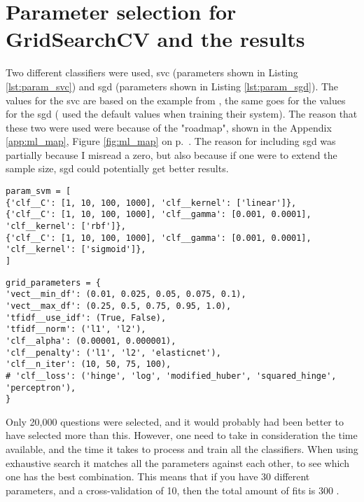 \section{Parameter selection for GridSearchCV and the results}
\label{sec:grid_search_and_results}
Two different classifiers were used, \gls{svc} (parameters shown in Listing \ref{lst:param_svc}) and \gls{sgd} (parameters shown in Listing \ref{lst:param_sgd}).
The values for the \gls{svc} are based on the example from \textcite{Scikitlearn.org2016k}, the same goes for the values for the \gls{sgd} \textcite{Scikitlearn.org2016l} 
(\cite{Huang2008, Maas2011, Zhang2003} used the default values when training their system). 
The reason that these two were used were because of the "roadmap", shown in the Appendix \ref{app:ml_map}, Figure \ref{fig:ml_map} on p.~\pageref{app:ml_map}. 
The reason for including \gls{sgd} was partially because I misread a zero, but also because if one were to extend the sample size, \gls{sgd} could potentially get better results.
\begin{lstlisting}[caption={Parameters for SVC}, label={lst:param_svc}] 
param_svm = [
{'clf__C': [1, 10, 100, 1000], 'clf__kernel': ['linear']},
{'clf__C': [1, 10, 100, 1000], 'clf__gamma': [0.001, 0.0001], 'clf__kernel': ['rbf']},
{'clf__C': [1, 10, 100, 1000], 'clf__gamma': [0.001, 0.0001], 'clf__kernel': ['sigmoid']},
]
\end{lstlisting}
\begin{lstlisting}[caption={Parameters for SGD}, label={lst:param_sgd}] 
grid_parameters = {
'vect__min_df': (0.01, 0.025, 0.05, 0.075, 0.1),
'vect__max_df': (0.25, 0.5, 0.75, 0.95, 1.0),
'tfidf__use_idf': (True, False),
'tfidf__norm': ('l1', 'l2'),
'clf__alpha': (0.00001, 0.000001),
'clf__penalty': ('l1', 'l2', 'elasticnet'),
'clf__n_iter': (10, 50, 75, 100),
# 'clf__loss': ('hinge', 'log', 'modified_huber', 'squared_hinge', 'perceptron'),
}
\end{lstlisting}
Only 20,000 questions were selected, and it would probably had been better to have selected more than this. 
However, one need to take in consideration the time available, and the time it takes to process and train all the classifiers. 
When using exhaustive search it matches all the parameters against each other, to see which one has the best combination. 
This means that if you have 30 different parameters, and a cross-validation of 10, then the total amount of fits is 300 \cite{Markham2015a}.

